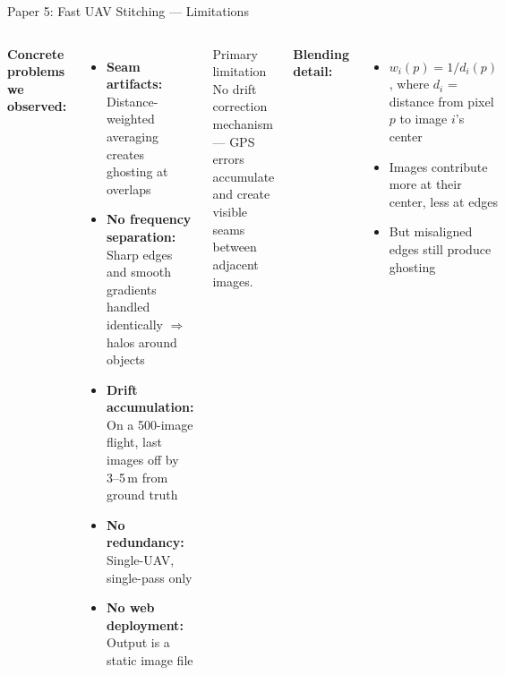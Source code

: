 \documentclass[aspectratio=169, 11pt]{beamer}
\begin{document}
\begin{frame}{Paper 5: Fast UAV Stitching --- Limitations}
\small
\begin{columns}[T]
\textbf{Concrete problems we observed:}
\begin{itemize}
    \item \textbf{Seam artifacts:} Distance-weighted averaging creates ghosting at overlaps
    \item \textbf{No frequency separation:} Sharp edges and smooth gradients handled identically $\Rightarrow$ halos around objects
    \item \textbf{Drift accumulation:} On a 500-image flight, last images off by 3--5\,m from ground truth
    \item \textbf{No redundancy:} Single-UAV, single-pass only
    \item \textbf{No web deployment:} Output is a static image file
\end{itemize}

\begin{alertblock}{Primary limitation}
No drift correction mechanism --- GPS errors accumulate and create visible seams between adjacent images.
\end{alertblock}

\vspace{0.3em}
\textbf{Blending detail:}
\begin{itemize}
    \item $w_i(p) = 1 / d_i(p)$, where $d_i$ = distance from pixel $p$ to image $i$'s center
    \item Images contribute more at their center, less at edges
    \item But misaligned edges still produce ghosting
\end{itemize}
\end{columns}
\end{frame}
\end{document}
